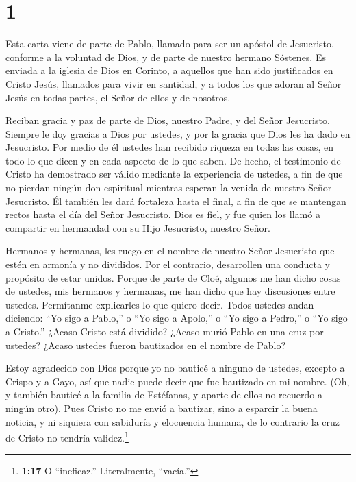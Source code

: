 \hypertarget{section}{%
\section{1}\label{section}}

 Esta carta viene de parte de Pablo, llamado para ser un
apóstol de Jesucristo, conforme a la voluntad de Dios, y de parte de
nuestro hermano Sóstenes.  Es enviada a la iglesia de Dios
en Corinto, a aquellos que han sido justificados en Cristo Jesús,
llamados para vivir en santidad, y a todos los que adoran al Señor Jesús
en todas partes, el Señor de ellos y de nosotros.

 Reciban gracia y paz de parte de Dios, nuestro Padre, y del
Señor Jesucristo.  Siempre le doy gracias a Dios por
ustedes, y por la gracia que Dios les ha dado en Jesucristo.
 Por medio de él ustedes han recibido riqueza en todas las
cosas, en todo lo que dicen y en cada aspecto de lo que saben.
 De hecho, el testimonio de Cristo ha demostrado ser válido
mediante la experiencia de ustedes,  a fin de que no pierdan
ningún don espiritual mientras esperan la venida de nuestro Señor
Jesucristo.  Él también les dará fortaleza hasta el final, a
fin de que se mantengan rectos hasta el día del Señor Jesucristo.
 Dios es fiel, y fue quien los llamó a compartir en
hermandad con su Hijo Jesucristo, nuestro Señor.

 Hermanos y hermanas, les ruego en el nombre de nuestro
Señor Jesucristo que estén en armonía y no divididos. Por el contrario,
desarrollen una conducta y propósito de estar unidos. 
Porque de parte de Cloé, algunos me han dicho cosas de ustedes, mis
hermanos y hermanas, me han dicho que hay discusiones entre ustedes.
 Permítanme explicarles lo que quiero decir. Todos ustedes
andan diciendo: ``Yo sigo a Pablo,'' o ``Yo sigo a Apolo,'' o ``Yo sigo
a Pedro,'' o ``Yo sigo a Cristo.''  ¿Acaso Cristo está
dividido? ¿Acaso murió Pablo en una cruz por ustedes? ¿Acaso ustedes
fueron bautizados en el nombre de Pablo?

 Estoy agradecido con Dios porque yo no bauticé a ninguno
de ustedes, excepto a Crispo y a Gayo,  así que nadie puede
decir que fue bautizado en mi nombre.  (Oh, y también
bauticé a la familia de Estéfanas, y aparte de ellos no recuerdo a
ningún otro).  Pues Cristo no me envió a bautizar, sino a
esparcir la buena noticia, y ni siquiera con sabiduría y elocuencia
humana, de lo contrario la cruz de Cristo no tendría validez.\footnote{\textbf{1:17}
  O ``ineficaz.'' Literalmente, ``vacía.''}


